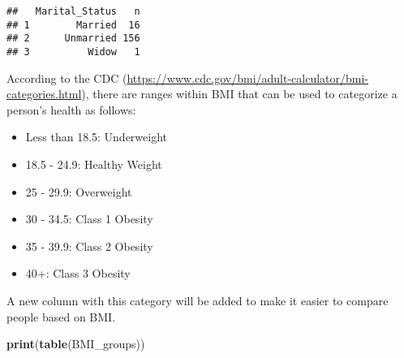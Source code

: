 \documentclass[
]{article}
\newenvironment{Shaded}{\begin{snugshade}}{\end{snugshade}}
\newcommand{\AttributeTok}[1]{\textcolor[rgb]{0.13,0.29,0.53}{#1}}
\newcommand{\DecValTok}[1]{\textcolor[rgb]{0.00,0.00,0.81}{#1}}
\newcommand{\FloatTok}[1]{\textcolor[rgb]{0.00,0.00,0.81}{#1}}
\newcommand{\FunctionTok}[1]{\textcolor[rgb]{0.13,0.29,0.53}{\textbf{#1}}}
\newcommand{\NormalTok}[1]{#1}
\newcommand{\OtherTok}[1]{\textcolor[rgb]{0.56,0.35,0.01}{#1}}
\newcommand{\SpecialCharTok}[1]{\textcolor[rgb]{0.81,0.36,0.00}{\textbf{#1}}}
\newcommand{\StringTok}[1]{\textcolor[rgb]{0.31,0.60,0.02}{#1}}
\providecommand{\tightlist}{%
  \setlength{\itemsep}{0pt}\setlength{\parskip}{0pt}}
\begin{document}
\begin{verbatim}
##   Marital_Status   n
## 1        Married  16
## 2      Unmarried 156
## 3          Widow   1
\end{verbatim}

According to the CDC
(\url{https://www.cdc.gov/bmi/adult-calculator/bmi-categories.html}),
there are ranges within BMI that can be used to categorize a person's
health as follows:

\begin{itemize}
\tightlist
\item
  Less than 18.5: Underweight
\item
  18.5 - 24.9: Healthy Weight
\item
  25 - 29.9: Overweight
\item
  30 - 34.5: Class 1 Obesity
\item
  35 - 39.9: Class 2 Obesity
\item
  40+: Class 3 Obesity
\end{itemize}

A new column with this category will be added to make it easier to
compare people based on BMI.

\begin{Shaded}
\end{Shaded}

\begin{Shaded}
\begin{Highlighting}[]
\FunctionTok{print}\NormalTok{(}\FunctionTok{table}\NormalTok{(BMI\_groups))}
\end{Highlighting}
\end{Shaded}
\end{document}
